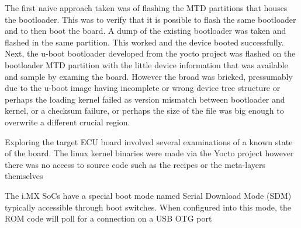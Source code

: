 The first naive approach taken was of flashing the MTD partitions that houses the bootloader. This was to verify that it is possible to flash the same bootloader and to then boot the board. A dump of the existing bootloader was taken and flashed in the same partition. This worked and the device booted successfully. Next, the u-boot bootloader developed from the yocto project was flashed on the bootloader MTD partition with the little device information that was available and sample by examing the board. However the broad was bricked, pressumably due to the u-boot image having incomplete or wrong device tree structure or perhaps the loading kernel failed as version mismatch between bootloader and kernel, or a checksum failure, or perhaps the size of the file was big enough to overwrite a different crucial region.



Exploring the target ECU board involved several examinations of a known state of the board. The linux kernel binaries were made via the Yocto project however there was no access to source code such as the recipes or the meta-layers themselves

The i.MX SoCs have a special boot mode named Serial Download Mode (SDM) typically accessible through boot switches. When configured into this mode, the ROM code will poll for a connection on a USB OTG port
